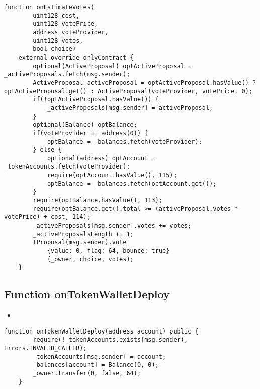 \begin{lstlisting}[firstnumber=60]
    function onEstimateVotes(
        uint128 cost,
        uint128 votePrice,
        address voteProvider,
        uint128 votes,
        bool choice)
    external override onlyContract {
        optional(ActiveProposal) optActiveProposal = _activeProposals.fetch(msg.sender);
        ActiveProposal activeProposal = optActiveProposal.hasValue() ? optActiveProposal.get() : ActiveProposal(voteProvider, votePrice, 0);
        if(!optActiveProposal.hasValue()) {
            _activeProposals[msg.sender] = activeProposal;
        }
        optional(Balance) optBalance;
        if(voteProvider == address(0)) {
            optBalance = _balances.fetch(voteProvider);
        } else {
            optional(address) optAccount = _tokenAccounts.fetch(voteProvider);
            require(optAccount.hasValue(), 115);
            optBalance = _balances.fetch(optAccount.get());
        }
        require(optBalance.hasValue(), 113);
        require(optBalance.get().total >= (activeProposal.votes * votePrice) + cost, 114);
        _activeProposals[msg.sender].votes += votes;
        _activeProposalsLength += 1;
        IProposal(msg.sender).vote
            {value: 0, flag: 64, bounce: true}
            (_owner, choice, votes);
    }
\end{lstlisting}

\subsection{Function onTokenWalletDeploy}

\begin{itemize}
\item {}
\end{itemize}

\begin{lstlisting}[firstnumber=237]
    function onTokenWalletDeploy(address account) public {
        require(!_tokenAccounts.exists(msg.sender), Errors.INVALID_CALLER);
        _tokenAccounts[msg.sender] = account;
        _balances[account] = Balance(0, 0);
        _owner.transfer(0, false, 64);
    }
\end{lstlisting}

